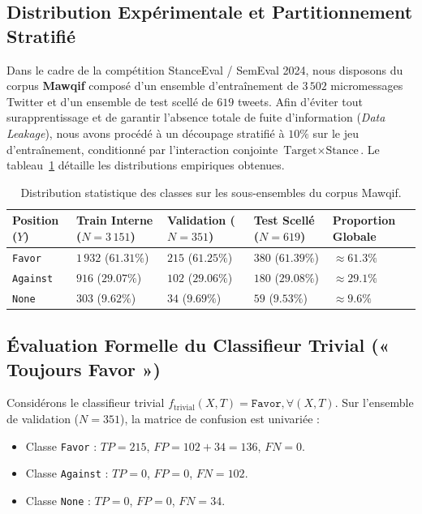 \documentclass[11pt,a4paper]{article}
\begin{document}
\subsection{Distribution Expérimentale et Partitionnement Stratifié}
Dans le cadre de la compétition StanceEval / SemEval 2024, nous disposons du corpus \textbf{Mawqif} composé d'un ensemble d'entraînement de $3\,502$ micromessages Twitter et d'un ensemble de test scellé de $619$ tweets. 
Afin d'éviter tout surapprentissage et de garantir l'absence totale de fuite d'information (\textit{Data Leakage}), nous avons procédé à un découpage stratifié à $10\%$ sur le jeu d'entraînement, conditionné par l'interaction conjointe $\text{Target} \times \text{Stance}$. Le tableau~\ref{tab:distribution} détaille les distributions empiriques obtenues.

\begin{table}[htbp]
\centering
\caption{Distribution statistique des classes sur les sous-ensembles du corpus Mawqif.}
\label{tab:distribution}
\begin{tabularx}{\textwidth}{lXXXX}
\toprule
\textbf{Position ($Y$)} & \textbf{Train Interne ($N=3\,151$)} & \textbf{Validation ($N=351$)} & \textbf{Test Scellé ($N=619$)} & \textbf{Proportion Globale} \\
\midrule
\texttt{Favor}   & $1\,932$ ($61.31\%$) & $215$ ($61.25\%$) & $380$ ($61.39\%$) & $\approx \mathbf{61.3\%}$ \\
\texttt{Against} & $916$ ($29.07\%$)   & $102$ ($29.06\%$) & $180$ ($29.08\%$) & $\approx \mathbf{29.1\%}$ \\
\texttt{None}    & $303$ ($9.62\%$)    & $34$ ($9.69\%$)   & $59$ ($9.53\%$)   & $\approx \mathbf{9.6\%}$ \\
\bottomrule
\end{tabularx}
\end{table}

\subsection{Évaluation Formelle du Classifieur Trivial (« Toujours Favor »)}
Considérons le classifieur trivial $f_{\text{trivial}}(X, T) = \texttt{Favor}, \forall (X, T)$. Sur l'ensemble de validation ($N=351$), la matrice de confusion est univariée :
\begin{itemize}[noitemsep]
    \item Classe \texttt{Favor} : $TP = 215$, $FP = 102 + 34 = 136$, $FN = 0$.
    \item Classe \texttt{Against} : $TP = 0$, $FP = 0$, $FN = 102$.
    \item Classe \texttt{None} : $TP = 0$, $FP = 0$, $FN = 34$.
\end{itemize}
\end{document}
